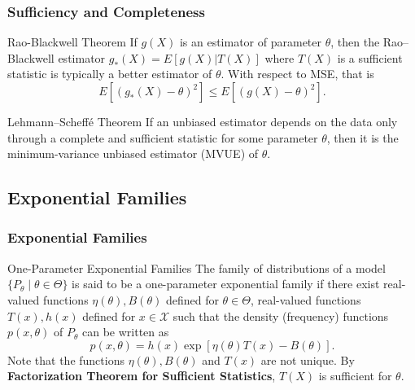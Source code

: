 \documentclass[serif,mathserif,professionalfont]{beamer}
\begin{document}
\begin{frame}
	
	\frametitle{Sufficiency and Completeness}
	
	\begin{block}{Rao-Blackwell Theorem}
		If $ g\left(X \right) $ is an estimator of parameter $ \theta $, then the Rao–Blackwell estimator $ g_*\left(X \right) = E\left[g\left(X \right) | T\left(X \right) \right] $ where $ T\left(X \right) $ is a sufficient statistic is typically a better estimator of $ \theta $. With respect to MSE, that is
		\begin{equation*}
		E\left[\left(g_*\left(X \right) - \theta \right)^2 \right] \leq E\left[\left(g\left(X \right) - \theta \right)^2 \right].
		\end{equation*}
	\end{block}
	
	\begin{block}{Lehmann–Scheff\'e Theorem}
		If an unbiased estimator depends on the data only through a complete and sufficient statistic for some parameter $ \theta $, then it is the minimum-variance unbiased estimator (MVUE) of $ \theta $.
	\end{block}
	
\end{frame}



\subsection{Exponential Families}


\begin{frame}
	
	\frametitle{Exponential Families}
	
	\begin{block}{One-Parameter Exponential Families}
		The family of distributions of a model $ \{P_{\theta} \; | \; \theta \in \Theta \} $ is said to be a one-parameter exponential family if there exist real-valued functions $ \eta\left(\theta \right), B\left(\theta \right) $ defined for $ \theta \in \Theta $, real-valued functions $ T\left(x \right), h\left(x \right) $ defined for $ x \in \mathcal{X} $ such that the density (frequency) functions $ p\left(x, \theta \right) $ of $ P_{\theta} $ can be written as
		\begin{equation*}
		p\left(x, \theta \right) = h\left(x \right) \exp \left[\eta\left(\theta \right) T\left(x \right) - B\left(\theta \right)  \right].
		\end{equation*}
		Note that the functions $ \eta\left(\theta \right), B\left(\theta \right) $ and $ T\left(x \right) $ are not unique. By \textbf{Factorization Theorem for Sufficient Statistics}, $ T\left(X \right) $ is sufficient for $ \theta $. 
	\end{block}
	

	
\end{frame}
\end{document}
